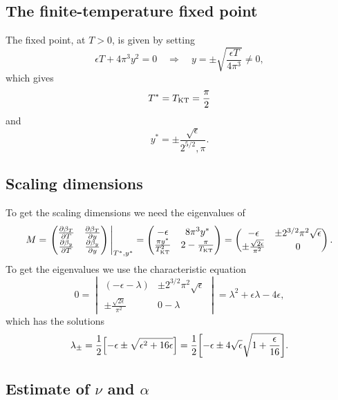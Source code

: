 \documentclass[11pt,letter, swedish, english
]{article}
\begin{document}
\subsection{The finite-temperature fixed point}
The fixed point, at $T>0$, is given by setting
\begin{equation}
\epsilon T +4\pi^3y^2 = 0
\quad\Longrightarrow\quad
y = \pm\sqrt{\frac{\epsilon T}{4\pi^3}} \neq0,
\end{equation}
which gives
\begin{equation}
T^* = T_{\text{KT}} = \frac{\pi}{2}
\end{equation}
and 
\begin{equation}
y^* = \pm\frac{\sqrt{\epsilon}}{2^{5/2},\pi}.
\end{equation}

\subsection{Scaling dimensions}
To get the scaling dimensions we need the eigenvalues of 
\begin{equation}
M = \eval{
\begin{pmatrix}
\pdv{\beta_T}{T} & \pdv{\beta_T}{y}\\
\pdv{\beta_y}{T} & \pdv{\beta_y}{y}
\end{pmatrix}
}_{T^*, y^*}
=
\begin{pmatrix}
-\epsilon & 8\pi^3 y^*\\
\frac{\pi y^*}{\TKT^2} & 2-\frac{\pi}{\TKT}
\end{pmatrix}
=
\begin{pmatrix}
-\epsilon & \pm2^{3/2}\pi^2\sqrt{\epsilon}\\
\pm \frac{\sqrt{2\epsilon}}{\pi^2} & 0
\end{pmatrix}.
\end{equation}
To get the eigenvalues we use the characteristic equation
\begin{equation}
0=
\begin{vmatrix}
(-\epsilon -\lambda) & \pm2^{3/2}\pi^2\sqrt{\epsilon}\\
\pm \frac{\sqrt{2\epsilon}}{\pi^2} & 0-\lambda
\end{vmatrix}
= \lambda^2 + \epsilon\lambda - 4\epsilon,
\end{equation}
which has the solutions
\begin{equation}
\lambda_\pm = \frac{1}{2}\qty[ -\epsilon
\pm\sqrt{\epsilon^2 + 16\epsilon}]
= \frac{1}{2}\qty[ -\epsilon
\pm4\sqrt{\epsilon}\sqrt{1+\frac{\epsilon}{16}}].
\end{equation}







\subsection{Estimate of $\nu$ and $\alpha$}
\end{document}
